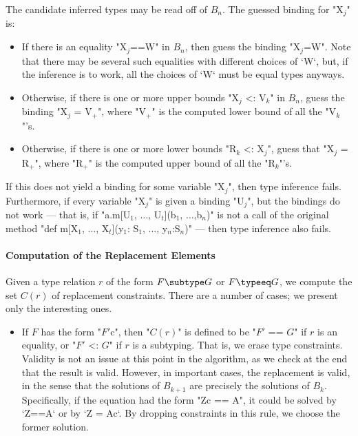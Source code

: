 {The candidate inferred types may be read off of {$B_n$}.  The guessed binding
for \xcdmath"X$_j$" is: 
\begin{itemize}
\item If there is an equality \xcdmath"X$_j$==W" in {$B_n$}, then guess the
      binding \xcdmath"X$_j$=W".  Note that there may be several such
      equalities with different choices of \xcd`W`, but, if the inference is
      to work, all the choices of \xcd`W` must be equal types anyways.
\item Otherwise, if there is one or more upper bounds 
\xcdmath"X$_j$ <: V$_k$" in {$B_n$}, guess the binding 
\xcdmath"X$_j$ = V$_+$", where 
\xcdmath"V$_+$" is the computed lower bound of all the \xcdmath"V$_k$"'s.
\item Otherwise, if there is one or more lower bounds 
\xcdmath"R$_k$ <: X$_j$", guess that
\xcdmath"X$_j$ = R$_+$", where 
\xcdmath"R$_+$" is the computed upper bound of all the \xcdmath"R$_k$"'s.
\end{itemize}
If this does not yield a binding for some variable \xcdmath"X$_j$", then type
inference fails.  Furthermore, if every variable \xcdmath"X$_j$" is given a
binding \xcdmath"U$_j$", but the 
bindings do not work --- 
that is, if 
\xcdmath"a.m[U$_1$, $\ldots$, U$_t$](b$_1$, $\ldots$,b$_n$)"
is not a call of 
the original method 
\xcdmath"def m[X$_1$, $\ldots$, X$_t$](y$_1$: S$_1$, $\ldots$, y$_n$:S$_n$)"
--- then type inference also fails.

\paragraph{Computation of the Replacement Elements}

Given a type relation
{$r$} of the form {$F \subtype G$}
or {$F \typeeq G$}, we compute the set {$C(r)$} of
replacement constraints.  There are a number of cases; we present only the
interesting ones. 

\begin{itemize}
\item If $F$ has the form \xcdmath"$F'${c}", then  
\xcdmath"$C(r)$" is defined to be
 \xcdmath"$F'$ == $G$" if $r$ is an equality, or 
 \xcdmath"$F'$ <: $G$" if {$r$} is a subtyping.
That is, we erase type constraints.  
Validity is not an issue at this point in the algorithm, as 
we check at the end that the result is valid.
However, in important cases, the replacement is valid, in the sense that the 
solutions of {$B_{k+1}$} are precisely the solutions of {$B_k$}.
Specifically, if the equation had the form \xcdmath"Z{c} == A", it could be
solved by \xcd`Z==A` or by \xcd`Z = A{c}`.  By dropping constraints in this
rule, we choose the former solution. 


\end{itemize}}
